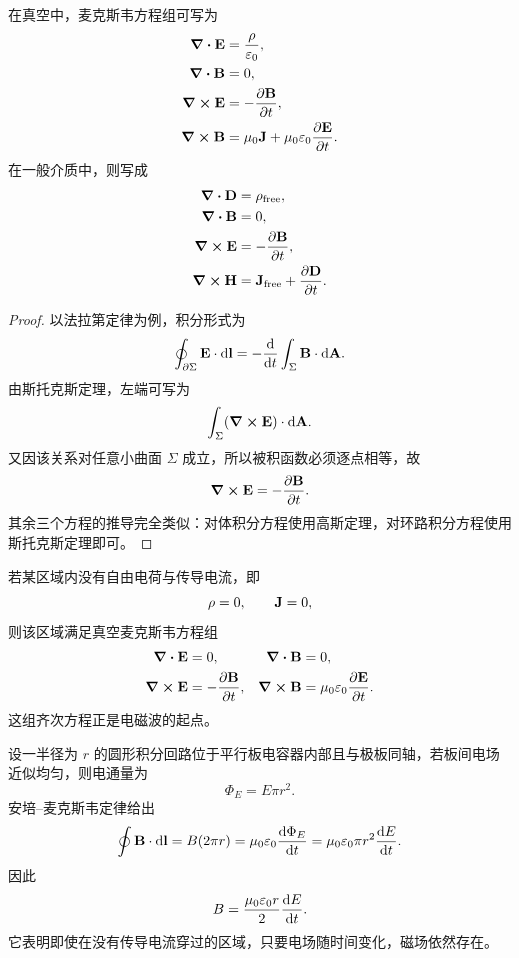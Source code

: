 \begin{theorem}[麦克斯韦方程组的微分形式]
在真空中，麦克斯韦方程组可写为
\begin{align*}
\div \vb{E} &= \frac{\rho}{\varepsilon_0}, \\
\div \vb{B} &= 0, \\
\curl \vb{E} &= -\pdv{\vb{B}}{t}, \\
\curl \vb{B} &= \mu_0\vb{J}+\mu_0\varepsilon_0\pdv{\vb{E}}{t}.
\end{align*}
在一般介质中，则写成
\begin{align*}
\div \vb{D} &= \rho_{\text{free}}, \\
\div \vb{B} &= 0, \\
\curl \vb{E} &= -\pdv{\vb{B}}{t}, \\
\curl \vb{H} &= \vb{J}_{\text{free}}+\pdv{\vb{D}}{t}.
\end{align*}
\end{theorem}

\begin{proof}
以法拉第定律为例，积分形式为
\[
\oint_{\partial \Sigma}\vb{E}\cdot \dd\vb{l}=-\dv{}{t}\int_\Sigma \vb{B}\cdot \dd\vb{A}.
\]
由斯托克斯定理，左端可写为
\[
\int_\Sigma (\curl \vb{E})\cdot \dd\vb{A}.
\]
又因该关系对任意小曲面 $\Sigma$ 成立，所以被积函数必须逐点相等，故
\[
\curl \vb{E}=-\pdv{\vb{B}}{t}.
\]
其余三个方程的推导完全类似：对体积分方程使用高斯定理，对环路积分方程使用斯托克斯定理即可。
\end{proof}

\begin{definition}[真空中的电磁场]
若某区域内没有自由电荷与传导电流，即
\[
\rho=0,\qquad \vb{J}=0,
\]
则该区域满足真空麦克斯韦方程组
\begin{align*}
\div \vb{E} &= 0, & \div \vb{B} &= 0,\\
\curl \vb{E} &= -\pdv{\vb{B}}{t}, & \curl \vb{B} &= \mu_0\varepsilon_0\pdv{\vb{E}}{t}.
\end{align*}
这组齐次方程正是电磁波的起点。
\end{definition}

\begin{example}[平行板电容器边缘处的磁场]
设一半径为 $r$ 的圆形积分回路位于平行板电容器内部且与极板同轴，若板间电场近似均匀，则电通量为
\[
\Phi_E=E\pi r^2.
\]
安培--麦克斯韦定律给出
\[
\oint \vb{B}\cdot \dd\vb{l}=B(2\pi r)=\mu_0\varepsilon_0 \dv{\Phi_E}{t}
=\mu_0\varepsilon_0 \pi r^2 \dv{E}{t}.
\]
因此
\[
B=\frac{\mu_0\varepsilon_0 r}{2}\dv{E}{t}.
\]
它表明即使在没有传导电流穿过的区域，只要电场随时间变化，磁场依然存在。
\end{example}

